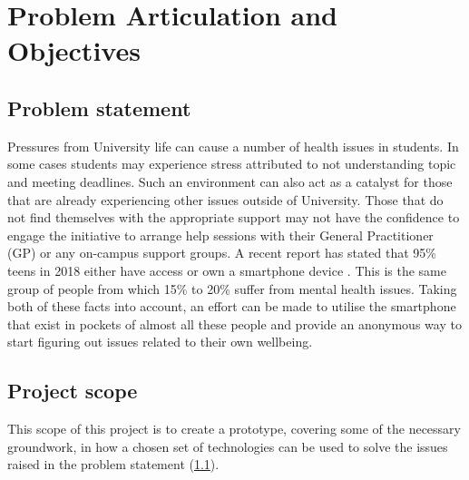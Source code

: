 \section{Problem Articulation and Objectives}

\subsection{Problem statement} \label{problemstatement}

Pressures from University life can cause a number of health issues in students.
In some cases students may experience stress attributed to not understanding topic and meeting deadlines.
Such an environment can also act as a catalyst for those that are already experiencing other issues outside of University.
Those that do not find themselves with the appropriate support may not have the confidence to engage the initiative to arrange help sessions 
with their General Practitioner (GP) or any on-campus support groups. 
A recent report has stated that 95\% teens in 2018 either have access or own a smartphone device \cite{monicajing2018teenstechnology}.
This is the same group of people from which 15\% to 20\% suffer from mental health issues.
Taking both of these facts into account, an effort can be made to utilise the smartphone that exist in pockets of almost all these people 
and provide an anonymous way to start figuring out issues related to their own wellbeing.


\subsection{Project scope}
This scope of this project is to create a prototype, covering some of the necessary groundwork, in how a chosen set of technologies can be used 
to solve the issues raised in the problem statement (\ref{problemstatement}).

